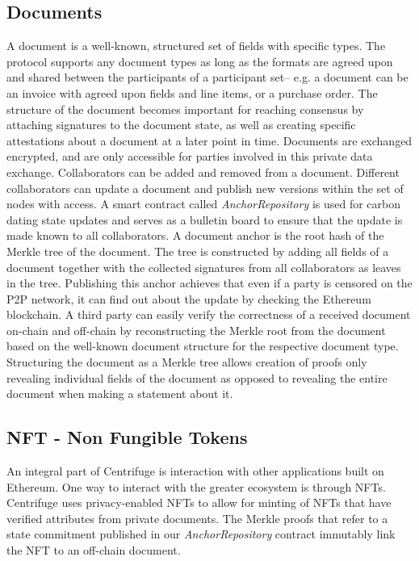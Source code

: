 \subsection{Documents}
A document is a well-known, structured set of fields with specific types. The protocol supports any document types as long as the formats are agreed upon and shared between the participants of a participant set-- e.g. a document can be an invoice with agreed upon fields and line items, or a purchase order. The structure of the document becomes important for reaching consensus by attaching signatures to the document state, as well as creating specific attestations about a document at a later point in time. Documents are exchanged encrypted, and are only accessible for parties involved in this private data exchange. Collaborators can be added and removed from a document. Different collaborators can update a document and publish new versions within the set of nodes with access.
A smart contract called \textit{AnchorRepository} is used for carbon dating state updates and serves as a bulletin board\cite{heiberg2018trade} to ensure that the update is made known to all collaborators. A document anchor is the root hash of the Merkle tree of the document. The tree is constructed by adding all fields of a document together with the collected signatures from all collaborators as leaves in the tree. Publishing this anchor achieves that even if a party is censored on the P2P network, it can find out about the update by checking the Ethereum blockchain.
A third party can easily verify the correctness of a received document on-chain and off-chain by reconstructing the Merkle root from the document based on the well-known document structure for the respective document type. Structuring the document as a Merkle tree allows creation of proofs only revealing individual fields of the document as opposed to revealing the entire document when making a statement about it.

\subsection{NFT - Non Fungible Tokens}
An integral part of Centrifuge is interaction with other applications built on Ethereum. One way to interact with the greater ecosystem is through NFTs. Centrifuge uses privacy-enabled NFTs\cite{centrifuge2018nft} to allow for minting of NFTs that have verified attributes from private documents. The Merkle proofs that refer to a state commitment published in our \textit{AnchorRepository} contract immutably link the NFT to an off-chain document.


